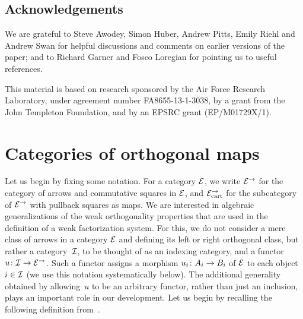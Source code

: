 \documentclass[reqno,10pt,a4paper,oneside,draft]{amsart}
\begin{document}
\subsection*{Acknowledgements}

We are grateful to Steve Awodey, Simon Huber, Andrew Pitts, Emily Riehl and Andrew Swan for helpful discussions and comments on earlier versions of the paper; and to Richard Garner and Fosco Loregian for pointing us to useful references.

This material is based on research sponsored by the Air Force Research Laboratory, under agreement number FA8655-13-1-3038, by a grant from the John Templeton Foundation, and by an EPSRC grant (EP/M01729X/1).

\section{Categories of orthogonal maps}
\label{sec:ortf}

Let us begin by fixing some notation.
For a category $\catE$, we write $\cal{E}^\to$ for the category of arrows and commutative squares in $\cal{E}$, and $\cal{E}^\to_{\cart}$ for the subcategory of $\cal{E}^\to$ with pullback squares as maps.
We are interested in algebraic generalizations of the weak orthogonality properties that are used in the definition of a weak factorization system.
For this, we do not consider a mere class of arrows in a category $\catE$ and defining its left or right orthogonal class, but rather a category~$\cal{I}$, to be thought of as an indexing category, and a functor~$u \co \cal{I} \to \catE^\to$.
Such a functor assigns a morphism $u_i \co A_i \to B_i$ of $\catE$ to each object~$i \in \cal{I}$ (we use this notation systematically below).
The additional generality obtained by allowing~$u$ to be an arbitrary functor, rather than just an inclusion, plays an important role in our development.
Let us begin by recalling the following definition from~\cite{garner:small-object-argument}.
\end{document}

